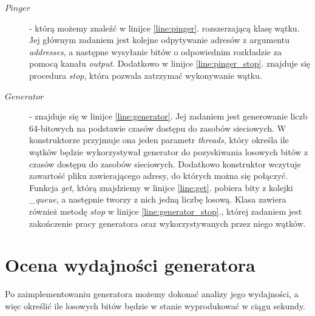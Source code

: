 \begin{description}
    \item[$Pinger$] - którą możemy znaleźć w linijce \ref{line:pinger}. rozszerzającą klasę wątku. Jej głównym zadaniem jest kolejne odpytywanie adresów z argumentu \emph{addresses}, a następne wysyłanie bitów o odpowiednim rozkładzie za pomocą kanału \emph{output}. Dodatkowo w linijce \ref{line:pinger_stop}. znajduje się procedura \emph{stop}, która pozwala zatrzymać wykonywanie wątku.
    \item[$Generator$] - znajduje się w linijce \ref{line:generator}. Jej zadaniem jest generowanie liczb 64-bitowych na podstawie czasów dostępu do zasobów sieciowych. W konstruktorze przyjmuje ona jeden parametr \emph{threads}, który określa ile wątków będzie wykorzystywał generator do pozyskiwania losowych bitów z czasów dostępu do zasobów sieciowych. Dodatkowo konstruktor wczytuje zawartość pliku zawierającego adresy, do których można się połączyć. Funkcja \emph{get}, którą znajdziemy w linijce \ref{line:get}. pobiera bity z kolejki \emph{\_queue}, a następnie tworzy z nich jedną liczbę losową. Klasa zawiera również metodę \emph{stop} w linijce \ref{line:generator_stop}., której zadaniem jest zakończenie pracy generatora oraz wykorzystywanych przez niego wątków. 
\end{description}
\section{Ocena wydajności generatora}
Po zaimplementowaniu generatora możemy dokonać analizy jego wydajności, a więc określić ile losowych bitów będzie w stanie wyprodukować w ciągu sekundy.

